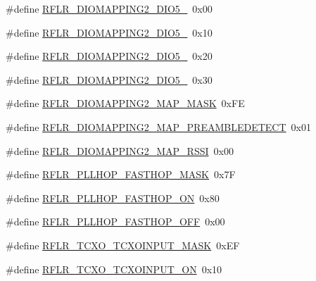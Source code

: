 \begin{DoxyCompactItemize}
\item 
\#define \mbox{\hyperlink{sx1276_regs-_lo_ra_8h_a0e5493d208e6868affd080d05a7d467e}{R\+F\+L\+R\+\_\+\+D\+I\+O\+M\+A\+P\+P\+I\+N\+G2\+\_\+\+D\+I\+O5\+\_}}~0x00
\item 
\#define \mbox{\hyperlink{sx1276_regs-_lo_ra_8h_aba65bbca70d5269aa6579f9511d3e7ff}{R\+F\+L\+R\+\_\+\+D\+I\+O\+M\+A\+P\+P\+I\+N\+G2\+\_\+\+D\+I\+O5\+\_}}~0x10
\item 
\#define \mbox{\hyperlink{sx1276_regs-_lo_ra_8h_a2ad3aaa57ff9cc5032a3dfa5459ee087}{R\+F\+L\+R\+\_\+\+D\+I\+O\+M\+A\+P\+P\+I\+N\+G2\+\_\+\+D\+I\+O5\+\_}}~0x20
\item 
\#define \mbox{\hyperlink{sx1276_regs-_lo_ra_8h_a293990dac05ba899104544d255d9e1f3}{R\+F\+L\+R\+\_\+\+D\+I\+O\+M\+A\+P\+P\+I\+N\+G2\+\_\+\+D\+I\+O5\+\_}}~0x30
\item 
\#define \mbox{\hyperlink{sx1276_regs-_lo_ra_8h_a4a8cafb2b79d52ca4f11f47fef8b9884}{R\+F\+L\+R\+\_\+\+D\+I\+O\+M\+A\+P\+P\+I\+N\+G2\+\_\+\+M\+A\+P\+\_\+\+M\+A\+SK}}~0x\+FE
\item 
\#define \mbox{\hyperlink{sx1276_regs-_lo_ra_8h_a3f69971419d7493c492a601189ba9831}{R\+F\+L\+R\+\_\+\+D\+I\+O\+M\+A\+P\+P\+I\+N\+G2\+\_\+\+M\+A\+P\+\_\+\+P\+R\+E\+A\+M\+B\+L\+E\+D\+E\+T\+E\+CT}}~0x01
\item 
\#define \mbox{\hyperlink{sx1276_regs-_lo_ra_8h_a20f17873979d88df5568f438d530d5ec}{R\+F\+L\+R\+\_\+\+D\+I\+O\+M\+A\+P\+P\+I\+N\+G2\+\_\+\+M\+A\+P\+\_\+\+R\+S\+SI}}~0x00
\item 
\#define \mbox{\hyperlink{sx1276_regs-_lo_ra_8h_ac5ab476a5c458941851fdd45d4dd863c}{R\+F\+L\+R\+\_\+\+P\+L\+L\+H\+O\+P\+\_\+\+F\+A\+S\+T\+H\+O\+P\+\_\+\+M\+A\+SK}}~0x7F
\item 
\#define \mbox{\hyperlink{sx1276_regs-_lo_ra_8h_abeb38c8feecc22921c7099f076dd6996}{R\+F\+L\+R\+\_\+\+P\+L\+L\+H\+O\+P\+\_\+\+F\+A\+S\+T\+H\+O\+P\+\_\+\+ON}}~0x80
\item 
\#define \mbox{\hyperlink{sx1276_regs-_lo_ra_8h_ac5a89ff2be0dcb49df1188731bfb6503}{R\+F\+L\+R\+\_\+\+P\+L\+L\+H\+O\+P\+\_\+\+F\+A\+S\+T\+H\+O\+P\+\_\+\+O\+FF}}~0x00
\item 
\#define \mbox{\hyperlink{sx1276_regs-_lo_ra_8h_a2c9b68a7cd24f958fce90a5e5fa48e3f}{R\+F\+L\+R\+\_\+\+T\+C\+X\+O\+\_\+\+T\+C\+X\+O\+I\+N\+P\+U\+T\+\_\+\+M\+A\+SK}}~0x\+EF
\item 
\#define \mbox{\hyperlink{sx1276_regs-_lo_ra_8h_a4af451aaa27188e884108961c0e24bbb}{R\+F\+L\+R\+\_\+\+T\+C\+X\+O\+\_\+\+T\+C\+X\+O\+I\+N\+P\+U\+T\+\_\+\+ON}}~0x10
\item 

\end{DoxyCompactItemize}
